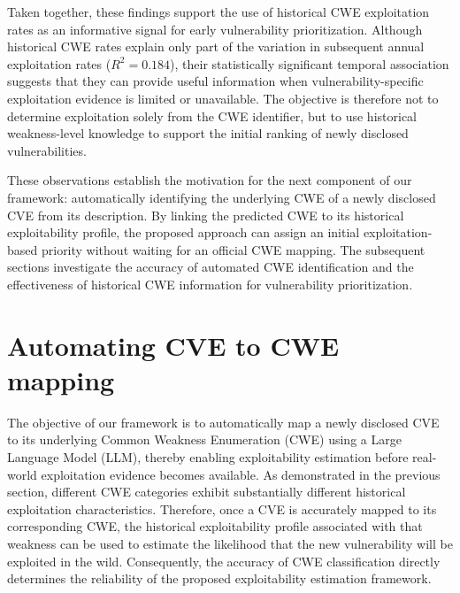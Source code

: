 \documentclass[conference,compsoc]{IEEEtran}
\begin{document}
Taken together, these findings support the use
of historical CWE exploitation rates as an
informative signal for early vulnerability
prioritization. Although historical CWE rates
explain only part of the variation in subsequent
annual exploitation rates ($R^2=0.184$),
their statistically significant temporal
association suggests that they can provide
useful information when vulnerability-specific
exploitation evidence is limited or unavailable.
The objective is therefore not to determine
exploitation solely from the CWE identifier,
but to use historical weakness-level knowledge
to support the initial ranking of newly
disclosed vulnerabilities.

These observations establish the motivation
for the next component of our framework:
automatically identifying the underlying CWE
of a newly disclosed CVE from its description.
By linking the predicted CWE to its historical
exploitability profile, the proposed approach
can assign an initial exploitation-based
priority without waiting for an official CWE
mapping. The subsequent sections investigate
the accuracy of automated CWE identification
and the effectiveness of historical CWE
information for vulnerability prioritization.



\section{Automating CVE to CWE mapping}

The objective of our framework is to automatically map a newly disclosed CVE to its underlying Common Weakness Enumeration (CWE) using a Large Language Model (LLM), thereby enabling exploitability estimation before real-world exploitation evidence becomes available. As demonstrated in the previous section, different CWE categories exhibit substantially different historical exploitation characteristics. Therefore, once a CVE is accurately mapped to its corresponding CWE, the historical exploitability profile associated with that weakness can be used to estimate the likelihood that the new vulnerability will be exploited in the wild. Consequently, the accuracy of CWE classification directly determines the reliability of the proposed exploitability estimation framework.
\end{document}
